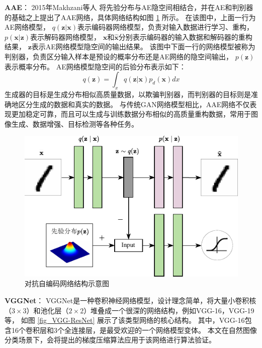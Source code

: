\documentclass{xdupgthesis}
\begin{document}
\textbf{AAE}：
2015年Makhzani等人 \cite{makhzani2015adversarial}将先验分布与AE隐空间相结合，并在AE和判别器的基础之上提出了AAE网络，具体网络结构如图 \ref{fig_AAE-Architecture} 所示。
在该图中，上面一行为AE网络模型，
$q\left( \mathbf{z}|\mathbf{x} \right)$表示编码器网络模型，负责对输入数据进行学习、重构，
$p\left( \mathbf{x}|\mathbf{z} \right)$表示解码器网络模型，
$\mathbf{x}$和$\mathbf{\hat{x}}$分别表示编码器的输入数据和解码器的重构结果，
$\mathbf{z}$表示AE网络模型隐空间的输出结果。
该图中下面一行的网络模型被称为判别器，负责区分输入样本是预设的概率分布还是AE网络的隐空间输出，
$p\left(\mathbf{z}\right)$表示概率分布。
AE网络模型隐空间的后验分布表示如下：
\begin{equation}
    q\left(\mathbf{z}\right) = 
        \int_{x} q\left(\mathbf{z}|\mathbf{x}\right) p_{d}\left(\mathbf{x}\right)dx 
\end{equation}
生成器的目标是生成分布相似高质量数据，以欺骗判别器，而判别器的目标则是准确地区分生成的数据和真实的数据。
与传统GAN网络模型相比，AAE网络不仅表现更加稳定可靠，而且可以生成与训练数据分布相似的高质量重构数据，常用于图像生成、数据增强、目标检测等各种任务。
\begin{figure}[ht]
    \centering
    \includegraphics[width=0.8\linewidth]{AAE-Architecture.pdf}
    \caption{对抗自编码网络结构示意图 \cite{makhzani2015adversarial}}
    \label{fig_AAE-Architecture}
\end{figure}

\textbf{VGGNet}：
VGGNet是一种卷积神经网络模型，设计理念简单，将大量小卷积核（$3\times3$）和池化层（$2\times2$）堆叠成一个很深的网络结构，例如VGG-16，VGG-19等，
如图 \ref{fig_VGG-ResNet}  展示了该类型网络的核心结构。
其中，VGG-16包含16个卷积层和3个全连接层，是最受欢迎的一个网络模型变体。
本文在自然图像分类场景下，会将提出的梯度压缩算法应用于该网络进行算法验证。
\end{document}

